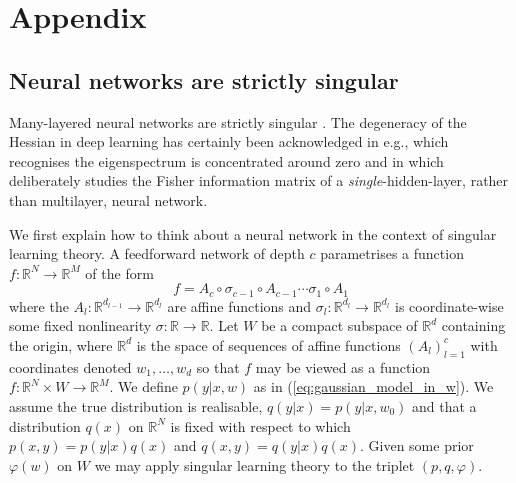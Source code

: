 \documentclass{article} %
\def\lto{\longrightarrow}
\begin{document}

%





\appendix
\section{Appendix}

\subsection{Neural networks are strictly singular}
\label{appendix:nn_singular}
Many-layered neural networks are strictly singular \citep[\S 7.2]{watanabe_algebraic_2009}. The degeneracy of the Hessian in deep learning has certainly been acknowledged in e.g., \citet{DBLP:journals/corr/SagunBL16} which recognises the eigenspectrum is concentrated around zero and in \citet{pennington_spectrum_2018} which deliberately studies the Fisher information matrix of a \textit{single}-hidden-layer, rather than multilayer, neural network. 

We first explain how to think about a neural network in the context of singular learning theory. A feedforward network of depth $c$ parametrises a function $f: \mathbb{R}^N \lto \mathbb{R}^M$ of the form
\[
f = A_c \circ \sigma_{c-1} \circ A_{c-1} \cdots \sigma_1 \circ A_1
\]
where the $A_l: \mathbb{R}^{d_{l-1}} \lto \mathbb{R}^{d_{l}}$ are affine functions and $\sigma_l: \mathbb{R}^{d_{l}} \lto \mathbb{R}^{d_{l}}$ is coordinate-wise some fixed nonlinearity $\sigma: \mathbb{R} \lto \mathbb{R}$. Let $W$ be a compact subspace of $\mathbb{R}^d$ containing the origin, where $\mathbb{R}^d$ is the space of sequences of affine functions $(A_l)_{l=1}^c$ with coordinates denoted $w_1,\ldots,w_d$ so that $f$ may be viewed as a function $f: \mathbb{R}^N \times W \lto \mathbb{R}^M$. We define $p(y|x,w)$ as in (\ref{eq:gaussian_model_in_w}). We assume the true distribution is realisable, $q(y|x) = p(y|x,w_0)$ and that a distribution $q(x)$ on $\mathbb{R}^N$ is fixed with respect to which $p(x,y) = p(y|x)q(x)$ and $q(x,y) = q(y|x)q(x)$. Given some prior $\varphi(w)$ on $W$ we may apply singular learning theory to the triplet $(p,q,\varphi)$.
\end{document}
